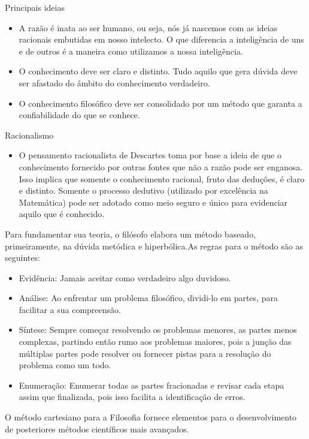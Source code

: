 \documentclass{beamer}
\begin{document}
\begin{frame}{}
    \begin{alertblock}{Principais ideias}
        \begin{itemize}
            \item A razão é inata ao ser humano, ou seja, nós já nascemos com as ideias racionais embutidas em nosso intelecto. O que diferencia a inteligência de uns e de outros é a maneira como utilizamos a nossa inteligência.
            \item O conhecimento deve ser claro e distinto. Tudo aquilo que gera dúvida deve ser afastado do âmbito do conhecimento verdadeiro.
            \item O conhecimento filosófico deve ser consolidado por um método que garanta a confiabilidade do que se conhece.
        \end{itemize}    
    \end{alertblock}
\end{frame}


\begin{frame}{}
    \begin{block}{Racionalismo}
        \begin{itemize}
            \item O pensamento racionalista de Descartes toma por base a ideia de que o conhecimento fornecido por outras fontes que não a razão pode ser enganosa. Isso implica que somente o conhecimento racional, fruto das deduções, é claro e distinto. Somente o processo dedutivo (utilizado por excelência na Matemática) pode ser adotado como meio seguro e único para evidenciar aquilo que é conhecido.
    
        \end{itemize}    
    \end{block}
\end{frame}


\begin{frame}
    \begin{block}{}
    Para fundamentar sua teoria, o filósofo elabora um método baseado, primeiramente, na dúvida metódica e hiperbólica.As regras para o método são as seguintes:
        \begin{itemize}
            \item Evidência: Jamais aceitar como verdadeiro algo duvidoso.
            \item Análise: Ao enfrentar um problema filosófico, dividi-lo em partes, para facilitar a sua compreensão.
            \item Síntese: Sempre começar resolvendo os problemas menores, as partes menos complexas, partindo então rumo aos problemas maiores, pois a junção das múltiplas partes pode resolver ou fornecer pistas para a resolução do problema como um todo.
            \item Enumeração: Enumerar todas as partes fracionadas e revisar cada etapa assim que finalizada, pois isso facilita a identificação de erros.
        \end{itemize}
O método cartesiano para a Filosofia fornece elementos para o desenvolvimento de posteriores métodos científicos mais avançados.
    \end{block}
\end{frame}
\end{document}
